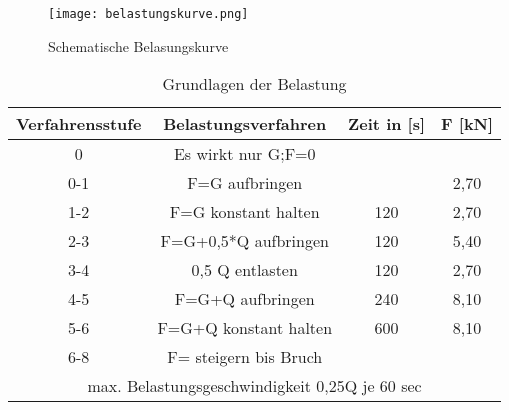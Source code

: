 \documentclass[12 pt,a4 paper ]{scrreprt}
\begin{document}
\begin{figure}
\begin{center}

	\texttt{[image: belastungskurve.png]}
	\caption{Schematische Belasungskurve}
	\label{belastungskurve}

\end{center}	
\end{figure}	

\begin{table}
\caption{Grundlagen der Belastung}
\begin{center}
\begin{tabular}{|c|c|c|c|}
\hline 
Verfahrensstufe & Belastungsverfahren & Zeit in [s] & F [kN] \\ 
\hline \hline
0 & Es wirkt nur G;F=0 &  &  \\ 
\hline 
0-1 & F=G aufbringen &  & 2,70 \\ 
\hline 
1-2 & F=G konstant halten & 120 & 2,70 \\ 
\hline 
2-3 & F=G+0,5*Q aufbringen & 120 & 5,40 \\ 
\hline 
3-4 & 0,5 Q entlasten & 120 & 2,70 \\ 
\hline 
4-5 & F=G+Q aufbringen & 240 & 8,10 \\ 
\hline 
5-6 & F=G+Q konstant halten & 600 & 8,10 \\ 
\hline 
6-8 & F= steigern bis Bruch &  &  \\ 
\hline \hline
\multicolumn{4}{|c|}{ max. Belastungsgeschwindigkeit 0,25Q je 60 sec} \\ 
\hline 
\end{tabular} 
\label{tab:belastung}
\end{center}
\end{table}

















	
	
	
\end{document}
